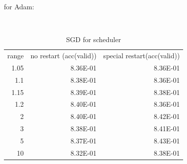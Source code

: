\documentclass{article}
\begin{document}
for Adam:
\begin{figure}[H]\label{q3:adamspecialRestart}
	\centering  %
	\label{Fig.main}
\end{figure}

 


\begin{table}[H]\label{q3:sgdScheduler}
  \centering
  \caption{SGD for scheduler}
    \begin{tabular}{rrr}
    \multicolumn{1}{l}{range} & \multicolumn{1}{l}{no restart (acc(valid))} & \multicolumn{1}{l}{special restart(acc(valid))} \\
    1.05  & 8.36E-01 & 8.36E-01 \\
    1.1   & 8.38E-01 & 8.36E-01 \\
    1.15  & 8.39E-01 & 8.38E-01 \\
    1.2   & 8.40E-01 & 8.36E-01 \\
    2     & 8.40E-01 & 8.42E-01 \\
    3     & 8.38E-01 & 8.41E-01 \\
    5     & 8.37E-01 & 8.43E-01 \\
    10    & 8.32E-01 & 8.38E-01 \\
    \end{tabular}%
  \label{tab:addlabel}%
\end{table}%
\end{document}
